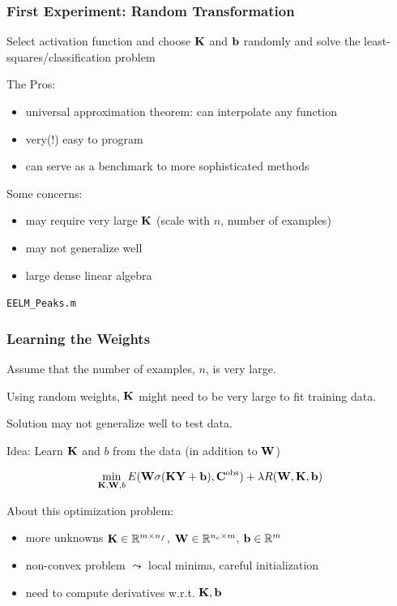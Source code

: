 \documentclass[12pt,fleqn,handout]{beamer}
\begin{document}
\begin{frame}\frametitle{First Experiment: Random Transformation}

Select activation function and choose ${\bf K}$ and ${\bf b}$ randomly and solve the least-squares/classification problem

\bigskip

The Pros:
\begin{itemize}
\item universal approximation theorem: can interpolate any function
\item very(!) easy to program
\item can serve as a benchmark to more sophisticated methods
\end{itemize}

\bigskip

Some concerns:
\begin{itemize}
\item may require very large ${\bf K}$ (scale with $n$, number of examples)
\item may not generalize well
\item large dense linear algebra
\end{itemize}

\begin{center}
	\texttt{EELM\_Peaks.m}
\end{center}
\end{frame}

\begin{frame}[fragile]\frametitle{Learning the Weights}

Assume that the number of examples, $n$, is very large.

Using random weights, ${\bf K}$ might need to be very large to fit training data.

Solution may not generalize well to test data.

\bigskip
\pause

Idea: Learn ${\bf K}$ and $b$  from the data (in addition to ${\bf W}$)

$$ \min_{{\bf K},{\bf W},b} E({\bf W}\sigma({\bf K} {\bf Y} + {\bf b}), {\bf C}^{\rm obs}) + \lambda R({\bf W},{\bf K},{\bf b})$$

About this optimization problem:
\begin{itemize}
	\item more unknowns ${\bf K} \in \mathbb{R}^{m \times n_f}$, ${\bf W} \in \mathbb{R}^{n_c \times m}$, ${\bf b} \in \mathbb{R}^m$
	\item  non-convex problem $\leadsto$ local minima, careful initialization
	\item need to compute derivatives w.r.t. ${\bf K}, {\bf b}$
\end{itemize}


\end{frame}
\end{document}
